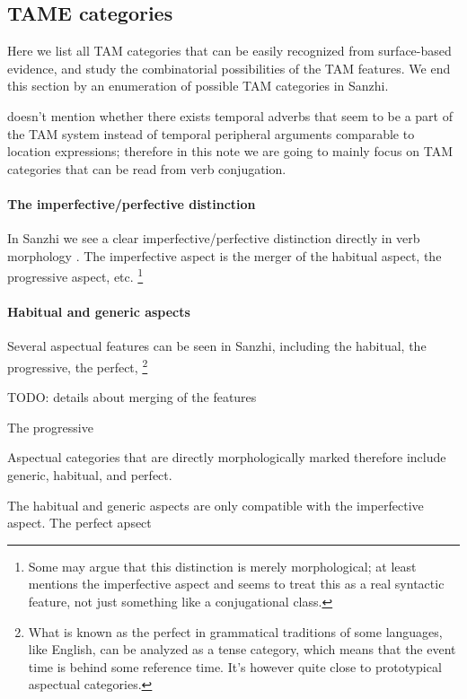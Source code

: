 \documentclass[a4paper, oneside, 12pt]{report}
\newcommand*{\citepage}[1]{p.~{#1}}
\begin{document}
\subsection{TAME categories} 

Here we list all TAM categories that can be easily recognized from surface-based evidence, 
and study the combinatorial possibilities of the TAM features.
We end this section by an enumeration of possible TAM categories in Sanzhi.

\citet{forker2020grammar} doesn't mention whether there exists 
temporal adverbs that seem to be a part of the TAM system 
instead of temporal peripheral arguments comparable to location expressions; 
therefore in this note we are going to mainly focus on TAM categories 
that can be read from verb conjugation.

\paragraph*{The imperfective/perfective distinction} 
In Sanzhi we see a clear imperfective/perfective distinction directly in verb morphology 
\citep[\citepage{206}]{forker2020grammar}. 
The imperfective aspect is the merger of the habitual aspect, the progressive aspect, etc.%
\footnote{
    Some may argue that this distinction is merely morphological; 
    at least \citet[\citepage{206}]{forker2020grammar} mentions the imperfective aspect 
    and seems to treat this as a real syntactic feature, 
    not just something like a conjugational class. 
}

\paragraph*{Habitual and generic aspects} 
Several aspectual features can be seen in Sanzhi, 
including the habitual, the progressive, the perfect,%
\footnote{
    What is known as the perfect in grammatical traditions of some languages, like English,
    can be analyzed as a tense category, 
    which means that the event time is behind some reference time. 
    It's however quite close to prototypical aspectual categories.
}



TODO: details about merging of the features 

The progressive

Aspectual categories that are directly morphologically marked therefore 
include generic, habitual, and perfect.

The habitual and generic aspects are only compatible with the imperfective aspect.
The perfect apsect 
\end{document}
